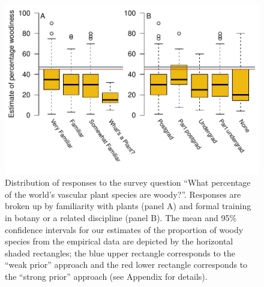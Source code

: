 \documentclass[a4paper,12pt]{article}
\begin{document}
\begin{figure}[p]
  \centering
  \includegraphics{figs/survey-results}
  \caption{Distribution of responses to the survey question ``What
    percentage of the world's vascular plant species are
    woody?''. Responses are broken up by familiarity with plants
    (panel A) and formal training in botany or a related discipline
    (panel B). The mean and 95\% confidence intervals for our
    estimates of the proportion of woody species from the empirical
    data are depicted by the horizontal shaded rectangles; the blue
    upper rectangle corresponds to the ``weak prior'' approach and the
    red lower rectangle corresponds to the ``strong prior'' approach
    (see Appendix for details).}
  \label{fig:survey}
\end{figure}

\clearpage
\renewcommand\thefigure{S.\arabic{figure}}
\renewcommand\thetable{S.\arabic{table}}
\setcounter{figure}{0}    
\setcounter{table}{0}    
\end{document}
